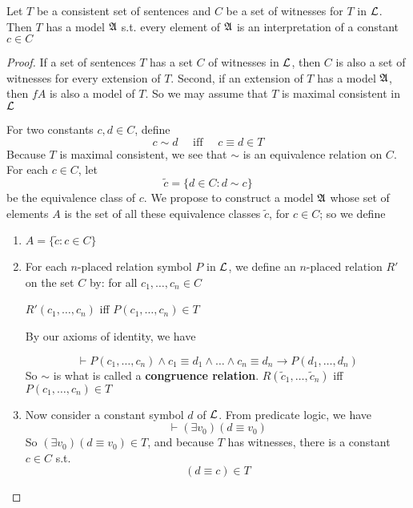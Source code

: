 \documentclass[11pt]{article}
\begin{document}
\begin{lemma}[]
\label{lemma2.1.2}
Let \(T\) be a consistent set of sentences and \(C\) be a set of witnesses
for \(T\) in \(\mathcal{L}\). Then \(T\) has a model \(\mathfrak{A}\) s.t. every element of
\(\mathfrak{A}\) is an interpretation of a constant \(c\in C\)
\end{lemma}

\begin{proof}
If a set of sentences \(T\) has a set \(C\) of witnesses in \(\mathcal{L}\), then
\(C\) is also a set of witnesses for every extension of \(T\). Second, if an
extension of \(T\) has a model \(\mathfrak{A}\), then \(fA\) is also a model of \(T\).
So we may assume that \(T\) is maximal consistent in \(\mathcal{L}\)

For two constants \(c,d\in C\), define
\begin{equation*}
c\sim d \quad\text{ iff }\quad
c\equiv d\in T
\end{equation*}
Because \(T\) is maximal consistent, we see that \(\sim\) is an equivalence
relation on \(C\). For each \(c\in C\), let
\begin{equation*}
\widetilde{c}=\{d\in C:d\sim c\}
\end{equation*}
be the equivalence class of \(c\). We propose to construct a model \(\mathfrak{A}\)
whose set of elements \(A\) is the set of all these equivalence classes
\(\widetilde{c}\), for \(c\in C\); so we define
\begin{enumerate}
\item \(A=\{\widetilde{c}:c\in C\}\)
\end{enumerate}



\begin{enumerate}
\setcounter{enumi}{1}
\item For each \(n\)-placed relation symbol \(P\) in \(\mathcal{L}\), we define an
\(n\)-placed relation \(R'\) on the set \(C\) by: for all \(c_1,\dots,c_n\in
      C\)

\(R'(c_1,\dots, c_n)\) iff \(P(c_1,\dots,c_n)\in T\)

By our axioms of identity, we have

\begin{equation*}
\vdash P(c_1,\dots,c_n)\wedge c_1\equiv d_1\wedge\dots\wedge c_n\equiv d_n\to
P(d_1,\dots,d_n)
\end{equation*}
So \(\sim\) is what is called a \textbf{congruence relation}.
\(R(\widetilde{c}_1,\dots,\widetilde{c}_n)\) iff
\(P(c_1,\dots,c_n)\in T\)
\item Now consider a constant symbol \(d\) of \(\mathcal{L}\). From predicate logic, we
have
\begin{equation*}
\vdash(\exists v_0)(d\equiv v_0)
\end{equation*}
So \((\exists v_0)(d\equiv v_0)\in T\), and because \(T\) has witnesses,
there is a constant \(c\in C\) s.t.
\begin{equation*}
(d\equiv c)\in T
\end{equation*}


\end{enumerate}
\end{proof}
\end{document}
